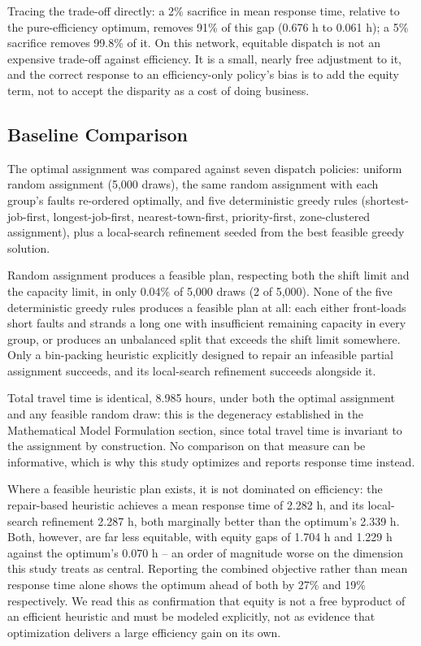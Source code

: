 \documentclass[11pt]{article}
\begin{document}
Tracing the trade-off directly: a 2\% sacrifice in mean response time, relative to the pure-efficiency optimum, removes 91\% of this gap (0.676 h to 0.061 h); a 5\% sacrifice removes 99.8\% of it. On this network, equitable dispatch is not an expensive trade-off against efficiency. It is a small, nearly free adjustment to it, and the correct response to an efficiency-only policy's bias is to add the equity term, not to accept the disparity as a cost of doing business.

\subsection*{Baseline Comparison}

The optimal assignment was compared against seven dispatch policies: uniform random assignment (5{,}000 draws), the same random assignment with each group's faults re-ordered optimally, and five deterministic greedy rules (shortest-job-first, longest-job-first, nearest-town-first, priority-first, zone-clustered assignment), plus a local-search refinement seeded from the best feasible greedy solution.

Random assignment produces a feasible plan, respecting both the shift limit and the capacity limit, in only 0.04\% of 5{,}000 draws (2 of 5{,}000). None of the five deterministic greedy rules produces a feasible plan at all: each either front-loads short faults and strands a long one with insufficient remaining capacity in every group, or produces an unbalanced split that exceeds the shift limit somewhere. Only a bin-packing heuristic explicitly designed to repair an infeasible partial assignment succeeds, and its local-search refinement succeeds alongside it.

Total travel time is identical, 8.985 hours, under both the optimal assignment and any feasible random draw: this is the degeneracy established in the Mathematical Model Formulation section, since total travel time is invariant to the assignment by construction. No comparison on that measure can be informative, which is why this study optimizes and reports response time instead.

Where a feasible heuristic plan exists, it is not dominated on efficiency: the repair-based heuristic achieves a mean response time of 2.282 h, and its local-search refinement 2.287 h, both marginally better than the optimum's 2.339 h. Both, however, are far less equitable, with equity gaps of 1.704 h and 1.229 h against the optimum's 0.070 h -- an order of magnitude worse on the dimension this study treats as central. Reporting the combined objective rather than mean response time alone shows the optimum ahead of both by 27\% and 19\% respectively. We read this as confirmation that equity is not a free byproduct of an efficient heuristic and must be modeled explicitly, not as evidence that optimization delivers a large efficiency gain on its own.
\end{document}
